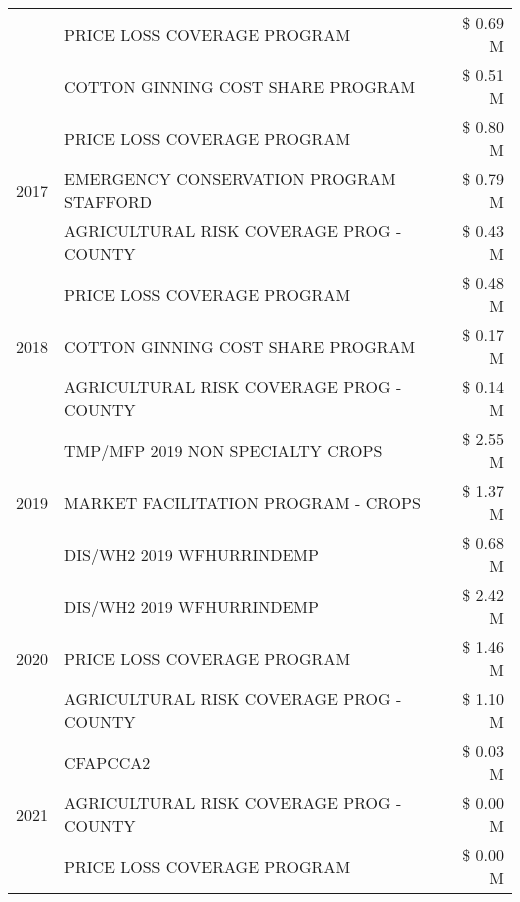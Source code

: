 \begin{tabular}{llr}
 & PRICE LOSS COVERAGE PROGRAM & \$ 0.69 M \\
 & COTTON GINNING COST SHARE PROGRAM & \$ 0.51 M \\
\cline{1-3}
\multirow[t]{3}{*}{2017} & PRICE LOSS COVERAGE PROGRAM & \$ 0.80 M \\
 & EMERGENCY CONSERVATION PROGRAM STAFFORD & \$ 0.79 M \\
 & AGRICULTURAL RISK COVERAGE PROG - COUNTY & \$ 0.43 M \\
\cline{1-3}
\multirow[t]{3}{*}{2018} & PRICE LOSS COVERAGE PROGRAM & \$ 0.48 M \\
 & COTTON GINNING COST SHARE PROGRAM & \$ 0.17 M \\
 & AGRICULTURAL RISK COVERAGE PROG - COUNTY & \$ 0.14 M \\
\cline{1-3}
\multirow[t]{3}{*}{2019} & TMP/MFP 2019 NON SPECIALTY CROPS & \$ 2.55 M \\
 & MARKET FACILITATION PROGRAM - CROPS & \$ 1.37 M \\
 & DIS/WH2 2019 WFHURRINDEMP & \$ 0.68 M \\
\cline{1-3}
\multirow[t]{3}{*}{2020} & DIS/WH2 2019 WFHURRINDEMP & \$ 2.42 M \\
 & PRICE LOSS COVERAGE PROGRAM & \$ 1.46 M \\
 & AGRICULTURAL RISK COVERAGE PROG - COUNTY & \$ 1.10 M \\
\cline{1-3}
\multirow[t]{3}{*}{2021} & CFAPCCA2 & \$ 0.03 M \\
 & AGRICULTURAL RISK COVERAGE PROG - COUNTY & \$ 0.00 M \\
 & PRICE LOSS COVERAGE PROGRAM & \$ 0.00 M \\
\cline{1-3}
\bottomrule
\end{tabular}
